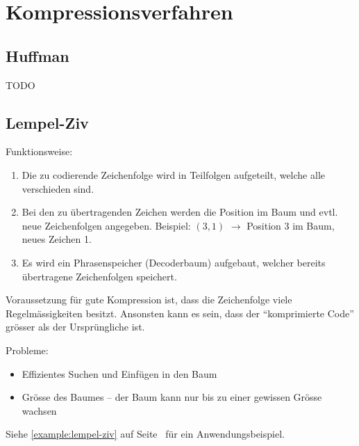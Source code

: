 \section{Kompressionsverfahren}

\subsection{Huffman}

TODO

\subsection{Lempel-Ziv}

Funktionsweise:

\begin{enumerate}
	\item Die zu codierende Zeichenfolge wird in Teilfolgen aufgeteilt, welche
		alle verschieden sind.
	\item Bei den zu übertragenden Zeichen werden die Position im Baum und evtl.
		neue Zeichenfolgen angegeben. Beispiel: $(3,1)$ $\rightarrow$ Position 3 im
		Baum, neues Zeichen 1.
	\item Es wird ein Phrasenspeicher (Decoderbaum) aufgebaut, welcher bereits
		übertragene Zeichenfolgen speichert.
\end{enumerate}

Voraussetzung für gute Kompression ist, dass die Zeichenfolge viele
Regelmässigkeiten besitzt. Ansonsten kann es sein, dass der ``komprimierte
Code'' grösser als der Ursprüngliche ist.

Probleme:
\begin{itemize}
	\item Effizientes Suchen und Einfügen in den Baum
	\item Grösse des Baumes -- der Baum kann nur bis zu einer gewissen Grösse wachsen
\end{itemize}

Siehe \autoref{example:lempel-ziv} auf Seite~\pageref{example:lempel-ziv}
für ein Anwendungsbeispiel.
